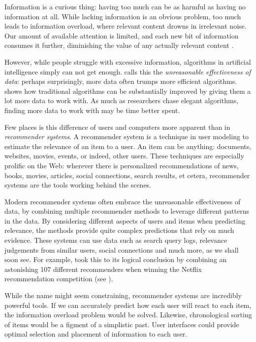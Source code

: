 \label{chap:intro}

Information is a curious thing:
having too much can be as harmful as having no information at all.
While lacking information is an obvious problem,
too much leads to information overload,
where relevant content drowns in irrelevant noise.
Our amount of available attention is limited, and each new bit
of information consumes it further,
diminishing the value of any actually relevant content
\cite[p1]{Davenport2001}.

However, while people struggle with excessive information,
algorithms in artificial intelligence simply can not get enough.
\citet[p1]{Halevy2009} calls this the \emph{unreasonable effectiveness of data}:
perhaps surprisingly, more data often trumps more efficient algorithms.
\citet[p3]{Banko2001} shows how traditional algorithms can be substantially
improved by giving them a lot more data to work with.
As much as researchers chase elegant algorithms,
finding more data to work with may be time better spent.

Few places is this difference of users and computers more apparent than in \emph{recommender systems}.
A recommender system is a technique in user modeling to estimate the relevance of an item to a user.
An item can be anything: documents, websites, movies, events, or indeed, other users.
These techniques are especially prolific on the Web: 
wherever there is personalized recommendations of news, books, movies,
articles, social connections, search results, et cetera, recommender systems are the tools
working behind the scenes.

Modern recommender systems often embrace the unreasonable effectiveness of data,
by combining multiple recommender methods to leverage different patterns in the data.
By considering different aspects of users and items when predicting relevance,
the methods provide quite complex predictions that rely on much evidence.
These systems can use data such as search query logs, relevance judgements from similar users,
social connections and much more, as we shall soon see.
For example, \citet[p1]{Bell2007} took this to its logical conclusion by 
combining an astonishing 107 different recommenders when winning the Netflix recommendation competition
(see \citet{Linden2009}).

While the name might seem constraining, recommender systems are incredibly powerful tools.
If we can accurately predict how each user will react to each item, the information overload problem would be solved.
Likewise, chronological sorting of items would be a figment of a simplistic past.
User interfaces could provide optimal selection and placement of information to each user.

